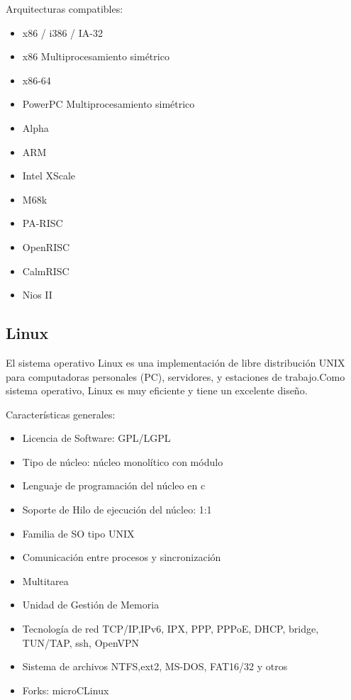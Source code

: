 Arquitecturas compatibles:

				\begin{itemize}
				\item x86 / i386 / IA-32
				\item x86 Multiprocesamiento simétrico
				\item x86-64
				\item PowerPC Multiprocesamiento simétrico
				\item Alpha
				\item ARM
				\item Intel XScale
				\item M68k
				\item PA-RISC
				\item OpenRISC
				\item CalmRISC
				\item Nios II
			\end{itemize}			

	

			 \subsection{Linux}

El sistema operativo Linux es una implementación de libre distribución UNIX para computadoras personales (PC), servidores, y estaciones de trabajo.Como sistema operativo, Linux es muy eficiente y tiene un excelente diseño.

 
Características generales:

	\begin{itemize}
	\item Licencia de Software: GPL/LGPL
	\item Tipo de núcleo: núcleo monolítico con módulo
	\item Lenguaje de programación del núcleo en c
	\item Soporte de Hilo de ejecución del núcleo: 1:1
	\item Familia de SO tipo UNIX
	\item Comunicación entre procesos y sincronización
	\item Multitarea
	\item Unidad de Gestión de Memoria 
	\item Tecnología de red TCP/IP,IPv6, IPX, PPP, PPPoE, DHCP, bridge, TUN/TAP, ssh, OpenVPN 	
	\item Sistema de archivos NTFS,ext2, MS-DOS, FAT16/32 y otros
	\item Forks: microCLinux	
	
\end{itemize}			

